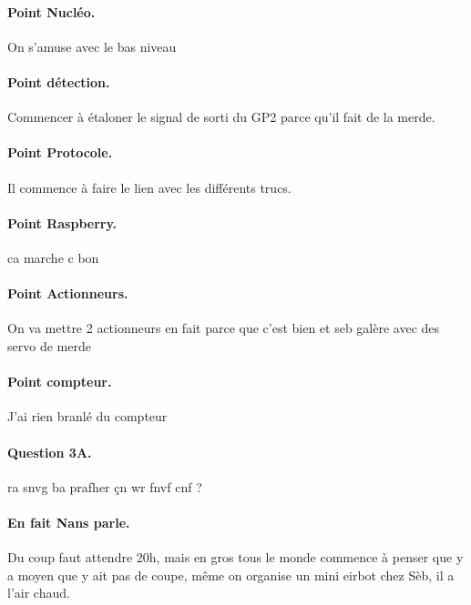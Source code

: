 \documentclass[a4paper,10pt]{report}
\begin{document}
\begin{spacing}{1.5}
\paragraph{Point Nucléo.}
On s'amuse avec le bas niveau
\paragraph{Point détection.}
Commencer à étaloner le signal de sorti du GP2 parce qu'il fait de la merde.
\paragraph{Point Protocole.}
Il commence à faire le lien avec les différents trucs.
\paragraph{Point Raspberry.}
ca marche c bon
\paragraph{Point Actionneurs.}
On va mettre 2 actionneurs en fait parce que c'est bien et seb galère avec des
servo de merde
\paragraph{Point compteur.}
J'ai rien branlé du compteur
\paragraph{Question 3A.} ra snvg ba prafher çn \og wr fnvf cnf ?\fg{}
\paragraph{En fait Nans parle.} Du coup faut attendre 20h, mais en gros tous le
monde commence à penser que y a moyen que y ait pas de coupe, même on organise
un mini eirbot chez Sèb, il a l'air chaud.
\newpage
\end{spacing}
\end{document}
